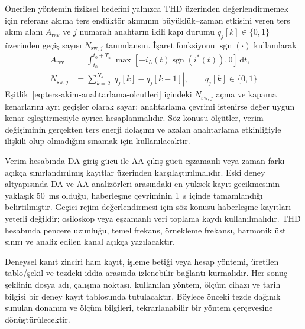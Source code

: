Önerilen yöntemin fiziksel hedefini yalnızca THD üzerinden değerlendirmemek için referans akıma ters endüktör akımının büyüklük--zaman etkisini veren ters akım alanı $A_{\mathrm{rev}}$ ve $j$ numaralı anahtarın ikili kapı durumu $q_j[k]\in\{0,1\}$ üzerinden geçiş sayısı $N_{\mathrm{sw},j}$ tanımlansın. İşaret fonksiyonu $\operatorname{sgn}(\cdot)$ kullanılarak
\begin{equation}
  \begin{aligned}
    A_{\mathrm{rev}} &= \int_{t_0}^{t_0+T_w}\max\!\left[-i_L(t)\operatorname{sgn}\!\left(i^{\ast}(t)\right),0\right]\,\mathrm{d}t, \\
    N_{\mathrm{sw},j} &= \sum_{k=2}^{N_s}\left|q_j[k]-q_j[k-1]\right|,
    \qquad q_j[k]\in\{0,1\}
  \end{aligned}
  \label{eq:ters-akim-anahtarlama-olcutleri}
\end{equation}
Eşitlik~\eqref{eq:ters-akim-anahtarlama-olcutleri} içindeki $N_{\mathrm{sw},j}$ açma ve kapama kenarlarını ayrı geçişler olarak sayar; anahtarlama çevrimi istenirse değer uygun kenar eşleştirmesiyle ayrıca hesaplanmalıdır. Söz konusu ölçütler, verim değişiminin gerçekten ters enerji dolaşımı ve azalan anahtarlama etkinliğiyle ilişkili olup olmadığını sınamak için kullanılacaktır.

Verim hesabında DA giriş gücü ile AA çıkış gücü eşzamanlı veya zaman farkı açıkça sınırlandırılmış kayıtlar üzerinden karşılaştırılmalıdır. Eski deney altyapısında DA ve AA analizörleri arasındaki en yüksek kayıt gecikmesinin yaklaşık \SI{50}{\milli\second} olduğu, haberleşme çevriminin \SI{1}{\second} içinde tamamlandığı belirtilmiştir. Geçici rejim değerlendirmesi için söz konusu haberleşme kayıtları yeterli değildir; osiloskop veya eşzamanlı veri toplama kaydı kullanılmalıdır. THD hesabında pencere uzunluğu, temel frekans, örnekleme frekansı, harmonik üst sınırı ve analiz edilen kanal açıkça yazılacaktır.

Deneysel kanıt zinciri ham kayıt, işleme betiği veya hesap yöntemi, üretilen tablo/şekil ve tezdeki iddia arasında izlenebilir bağlantı kurmalıdır. Her sonuç şeklinin dosya adı, çalışma noktası, kullanılan yöntem, ölçüm cihazı ve tarih bilgisi bir deney kayıt tablosunda tutulacaktır. Böylece önceki tezde dağınık sunulan donanım ve ölçüm bilgileri, tekrarlanabilir bir yöntem çerçevesine dönüştürülecektir.


